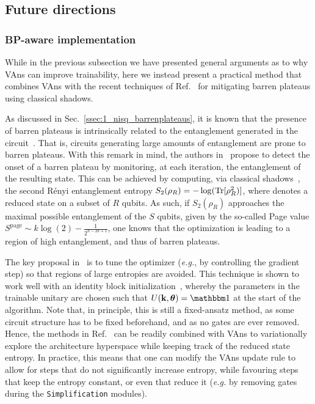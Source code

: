 \subsection{Future directions}

\subsubsection{BP-aware implementation}
While in the previous subsection we have presented general arguments as to why VAns can improve trainability, here we instead present a practical method that combines VAns with the recent techniques of Ref.~\cite{sack2022avoiding} for mitigating barren plateaus using classical shadows.

As discussed in Sec.~\ref{ssec:1_nisq_barrenplateaus}, it is known that the presence of barren plateaus is intrinsically related to the entanglement generated in the circuit~\cite{sharma2020trainability,patti2020entanglement,marrero2020entanglement}. That is, circuits generating large amounts of entanglement are prone to barren plateaus. With this remark in mind, the authors in~\cite{sack2022avoiding} propose to detect the onset of a barren plateau by monitoring, at each iteration, the entanglement of the resulting state. This can be achieved by computing, via classical shadows~\cite{huang2020predicting}, the second R\'enyi entanglement entropy $S_2(\rho_R)=-\log(\text{Tr}[\rho_R^2)]$, where
denotes a reduced state on a subset of $R$ qubits. As such, if $S_2(\rho_R)$ approaches the maximal possible entanglement of the $S$ qubits, given by the so-called Page value $S^{\text{page}}\sim k\log(2)-\frac{1}{2^{n-2k+1}}$, one knows that the optimization is leading to a region of high entanglement, and thus of barren plateaus.

The key proposal in~\cite{sack2022avoiding} is to tune the optimizer (\textit{e.g.}, by controlling the gradient step) so that regions of large entropies are avoided. This technique is shown to work well with an identity block initialization~\cite{grant2019initialization}, whereby the parameters in the trainable unitary are chosen such that $U(\kvec,\thv)=\id$
at the start of the algorithm. Note that, in principle, this is still a fixed-ansatz method, as some circuit structure has to be fixed beforehand, and as no gates are ever removed. Hence, the methods in Ref.~\cite{sack2022avoiding} can be readily combined with VAns to variationally explore the architecture hyperspace while keeping track of the reduced state entropy. In practice, this means that one can modify the VAns update rule to allow for steps that do not significantly increase entropy, while favouring steps that keep the entropy constant, or even that reduce it (\textit{e.g.} by removing gates during the \texttt{Simplification} modules).

